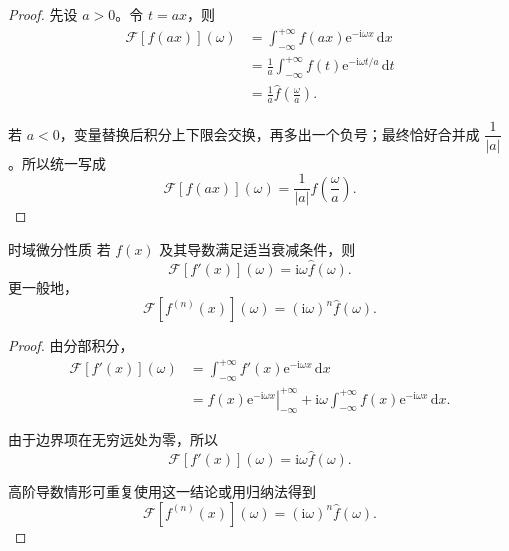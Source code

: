 \begin{proof}
先设 $a>0$。令 $t=ax$，则
\begin{align}
    \mathcal{F}[f(ax)](\omega)
    &=
    \int_{-\infty}^{+\infty}
    f(ax)\mathrm{e}^{-\mathrm{i}\omega x}\,\mathrm{d}x \\
    &=
    \frac{1}{a}\int_{-\infty}^{+\infty}
    f(t)\mathrm{e}^{-\mathrm{i}\omega t/a}\,\mathrm{d}t \\
    &=
    \frac{1}{a}\hat{f}\!\left(\frac{\omega}{a}\right).
\end{align}

若 $a<0$，变量替换后积分上下限会交换，再多出一个负号；最终恰好合并成 $\dfrac{1}{|a|}$。所以统一写成
\begin{equation}
    \mathcal{F}[f(ax)](\omega)=\frac{1}{|a|}\hat{f}\!\left(\frac{\omega}{a}\right).
\end{equation}
\end{proof}

\begin{dingli}{时域微分性质}{}
若 $f(x)$ 及其导数满足适当衰减条件，则
\begin{equation}
    \mathcal{F}[f'(x)](\omega)=\mathrm{i}\omega \hat{f}(\omega).
\end{equation}
更一般地，
\begin{equation}
    \mathcal{F}[f^{(n)}(x)](\omega)=(\mathrm{i}\omega)^n \hat{f}(\omega).
\end{equation}
\end{dingli}

\begin{proof}
由分部积分，
\begin{align}
    \mathcal{F}[f'(x)](\omega)
    &=
    \int_{-\infty}^{+\infty}
    f'(x)\mathrm{e}^{-\mathrm{i}\omega x}\,\mathrm{d}x \\
    &=
    \left.f(x)\mathrm{e}^{-\mathrm{i}\omega x}\right|_{-\infty}^{+\infty}
    +
    \mathrm{i}\omega
    \int_{-\infty}^{+\infty}
    f(x)\mathrm{e}^{-\mathrm{i}\omega x}\,\mathrm{d}x.
\end{align}

由于边界项在无穷远处为零，所以
\begin{equation}
    \mathcal{F}[f'(x)](\omega)=\mathrm{i}\omega \hat{f}(\omega).
\end{equation}

高阶导数情形可重复使用这一结论或用归纳法得到
\begin{equation}
    \mathcal{F}[f^{(n)}(x)](\omega)=(\mathrm{i}\omega)^n \hat{f}(\omega).
\end{equation}
\end{proof}

